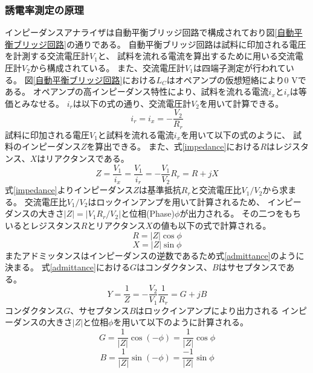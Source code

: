 \documentclass[dvipdfmx,12pt,a4paper]{jreport}
\begin{document}
			\subsubsection{誘電率測定の原理}
			インピーダンスアナライザは自動平衡ブリッジ回路で構成されており図\ref{自動平衡ブリッジ回路}の通りである。
			自動平衡ブリッジ回路は試料に印加される電圧を計測する交流電圧計$V_1$と、
			試料を流れる電流を算出するために用いる交流電圧計$V_2$から構成されている。
			また、交流電圧計$V_1$は四端子測定が行われている。
			図\ref{自動平衡ブリッジ回路}における$L_C$はオペアンプの仮想短絡により0 Vである。
			オペアンプの高インピーダンス特性により、試料を流れる電流$i_x$と$i_r$は等価とみなせる。
			$i_r$は以下の式の通り、交流電圧計$V_2$を用いて計算できる。
			\begin{equation}
				i_r=i_x=-\frac{V_2}{R_r}
			\end{equation}
			試料に印加される電圧$V_1$と試料を流れる電流$i_x$を用いて以下の式のように、
			試料のインピーダンス$Z$を算出できる。
			また、式\ref{impedance}における$R$はレジスタンス、$X$はリアクタンスである。
			\begin{equation}
				Z=\frac{V_1}{i_x}=\frac{V_1}{i_r}=-\frac{V_1}{V_2}R_r = R + j X  
				\label{impedance}
			\end{equation}
			式\ref{impedance}よりインピーダンス$Z$は基準抵抗$R_r$と交流電圧比$V_1/V_2$から求まる。
			交流電圧比$V_1/V_2$はロックインアンプを用いて計算されるため、
			インピーダンスの大きさ$|Z|=|V_1 R_r/V_2|$と位相(Phase)$\phi$が出力される。
			その二つをもちいるとレジスタンス$R$とリアクタンス$X$の値も以下の式で計算される。
			\begin{equation}
				R = |Z| \cos \phi
			\end{equation}
			\begin{equation}
				X = |Z| \sin \phi
			\end{equation}
			またアドミッタンスはインピーダンスの逆数であるため式\ref{admittance}のように決まる。
			式\ref{admittance}における$G$はコンダクタンス、$B$はサセプタンスである。
			\begin{equation}
				Y= \frac{1}{Z}=-\frac{V_2}{V_1}\frac{1}{R_r} = G + j B
				\label{admittance}
			\end{equation}
			コンダクタンス$G$、サセプタンス$B$はロックインアンプにより出力される
			インピーダンスの大きさ$|Z|$と位相$\phi$を用いて以下のように計算される。
			\begin{equation}
				G = \frac{1}{|Z|} \cos \left(-\phi\right) = \frac{1}{|Z|} \cos \phi
				\label{コンダクタンス}
			\end{equation}
			\begin{equation}
				B = \frac{1}{|Z|} \sin(-\phi) = \frac{-1}{|Z|}\sin \phi
				\label{サセプタンス}
			\end{equation}
\end{document}
